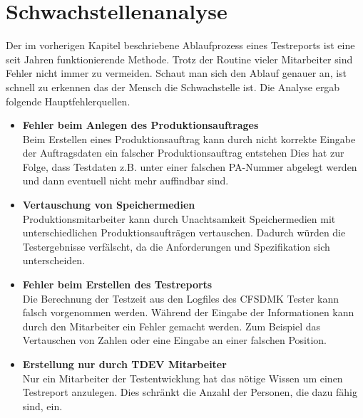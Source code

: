 \section{Schwachstellenanalyse}
Der im vorherigen Kapitel beschriebene Ablaufprozess eines Testreports ist eine seit Jahren funktionierende Methode. Trotz der Routine vieler Mitarbeiter sind Fehler nicht immer zu vermeiden. Schaut man sich den Ablauf genauer an, ist schnell zu erkennen das der Mensch die Schwachstelle ist. Die Analyse ergab folgende Hauptfehlerquellen. 
\begin{itemize}
\item \textbf{Fehler beim Anlegen des Produktionsauftrages} \\
Beim Erstellen eines Produktionsauftrag kann durch nicht korrekte Eingabe der Auftragsdaten ein falscher Produktionsauftrag entstehen Dies hat zur Folge, dass Testdaten z.B. unter einer falschen \ac{PA}-Nummer abgelegt werden und dann eventuell nicht mehr auffindbar sind.
\item \textbf{Vertauschung von Speichermedien} \\
Produktionsmitarbeiter kann durch Unachtsamkeit Speichermedien mit unterschiedlichen Produktionsaufträgen vertauschen. Dadurch würden die Testergebnisse verfälscht, da die Anforderungen und Spezifikation sich unterscheiden.
\item \textbf{Fehler beim Erstellen des Testreports} \\
Die Berechnung der Testzeit aus den Logfiles des \ac{CFSDMK} Tester kann falsch vorgenommen werden. Während der Eingabe der Informationen kann durch den Mitarbeiter ein Fehler gemacht werden. Zum Beispiel das Vertauschen von Zahlen oder eine Eingabe an einer falschen Position.
\item \textbf{Erstellung nur durch TDEV Mitarbeiter} \\
Nur ein Mitarbeiter der Testentwicklung hat das nötige Wissen um einen Testreport anzulegen. Dies schränkt die Anzahl der Personen, die dazu fähig sind, ein.
\end{itemize}
\newpage
	
